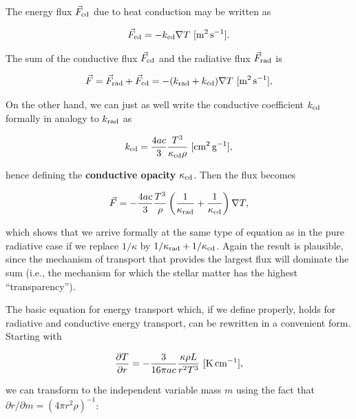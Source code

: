 \documentclass[a4paper,10pt]{article}
\begin{document}
{\noindent}The energy flux $\vec{F}_{\rm cd}$ due to heat conduction may be written as

\begin{align*}
    \vec{F}_{\rm cd} = -k_{\rm cd}\nabla T ~ [{\rm m^2\,s^{-1}}].
\end{align*}

{\noindent}The sum of the conductive flux $\vec{F}_{\rm cd}$ and the radiative flux $\vec{F}_{\rm rad}$ is

\begin{align*}
    \vec{F} = \vec{F}_{\rm rad}+\vec{F}_{\rm cd} = -(k_{\rm rad}+k_{\rm cd})\nabla T ~ [{\rm m^2\,s^{-1}}],
\end{align*}

{\noindent}On the other hand, we can just as well write the conductive coefficient $k_{\rm cd}$ formally in analogy to $k_{\rm rad}$ as

\begin{align*}
    k_{\rm cd} = \frac{4ac}{3}\frac{T^3}{\kappa_{\rm cd}\rho} ~ [{\rm cm^2\,g^{-1}}],
\end{align*}

{\noindent}hence defining the \textbf{conductive opacity} $\kappa_{\rm cd}$. Then the flux becomes

\begin{align*}
    \vec{F} = -\frac{4ac}{3}\frac{T^3}{\rho} \left(\frac{1}{\kappa_{\rm rad}}+\frac{1}{\kappa_{\rm cd}}\right) \nabla T,
\end{align*}

{\noindent}which shows that we arrive formally at the same type of equation as in the pure radiative case if we replace $1/\kappa$ by $1/\kappa_{\rm rad}+1/\kappa_{\rm cd}$. Again the result is plausible, since the mechanism of transport that provides the largest flux will dominate the sum (i.e., the mechanism for which the stellar matter has the highest ``transparency'').

{\noindent}The basic equation for energy transport which, if we define properly, holds for radiative and conductive energy transport, can be rewritten in a convenient form. Starting with

\begin{align*}
    \frac{\partial T}{\partial r} = - \frac{3}{16\pi ac} \frac{\kappa\rho L}{r^2T^3} ~ [{\rm K\,cm^{-1}}],
\end{align*}

{\noindent}we can transform to the independent variable mass $m$ using the fact that $\partial r/\partial m = (4\pi r^2\rho)^{-1}$:
\end{document}
